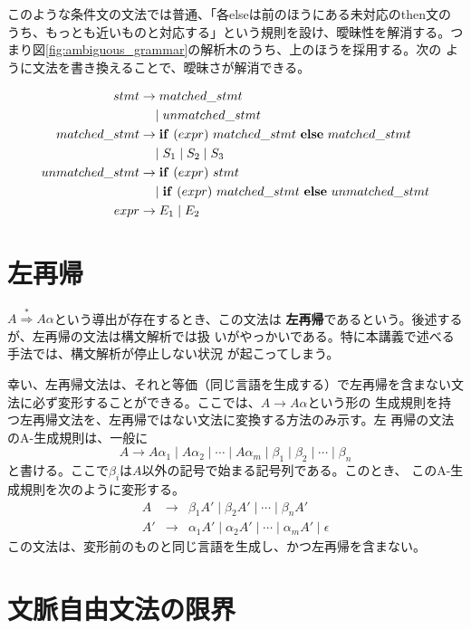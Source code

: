 このような条件文の文法では普通、「各elseは前のほうにある未対応のthen文の
うち、もっとも近いものと対応する」という規則を設け、曖昧性を解消する。つ
まり図\ref{fig:ambiguous_grammar}の解析木のうち、上のほうを採用する。次の
ように文法を書き換えることで、曖昧さが解消できる。

\begin{align*}
 stmt & \rightarrow matched\_stmt \\
      & \quad\mid        unmatched\_stmt \\
 matched\_stmt & \rightarrow {\bf if}\ (expr)\ matched\_stmt\ {\bf
  else}\ matched\_stmt \\
      & \quad\mid S_1 \mid S_2 \mid S_3 \\
 unmatched\_stmt & \rightarrow {\bf if}\ (expr)\ stmt \\
                 & \quad\mid        {\bf if}\ (expr)\ matched\_stmt\ {\bf
		  else}\ unmatched\_stmt \\
 expr & \rightarrow E_1 \mid E_2
\end{align*}

\section{左再帰}
\label{121145_31Mar06}

$A \stackrel{*}{\Rightarrow} A\alpha$という導出が存在するとき、この文法は
{\bfseries 左再帰}であるという。後述するが、左再帰の文法は構文解析では扱
いがやっかいである。特に本講義で述べる手法では、構文解析が停止しない状況
が起こってしまう。

幸い、左再帰文法は、それと等価（同じ言語を生成する）で左再帰を含まない文
法に必ず変形することができる。ここでは、$A \rightarrow A\alpha$という形の
生成規則を持つ左再帰文法を、左再帰ではない文法に変換する方法のみ示す。左
再帰の文法のA-生成規則は、一般に
\[
 A \rightarrow A\alpha_1 \mid A\alpha_2 \mid \cdots \mid A\alpha_m \mid \beta_1 \mid
 \beta_2 \mid \cdots \mid \beta_n
\]
と書ける。ここで$\beta_i$は$A$以外の記号で始まる記号列である。このとき、
このA-生成規則を次のように変形する。
\begin{eqnarray*}
 A & \rightarrow & \beta_1 A' \mid \beta_2 A' \mid \cdots \mid \beta_n A' \\
 A' & \rightarrow & \alpha_1 A' \mid \alpha_2 A' \mid \cdots \mid \alpha_m A' \mid \epsilon
\end{eqnarray*}
この文法は、変形前のものと同じ言語を生成し、かつ左再帰を含まない。

\section{文脈自由文法の限界}
\label{110128_3Apr06}

